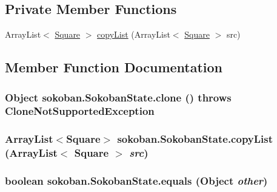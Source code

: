 \subsection*{Private Member Functions}
\begin{CompactItemize}
\item 
ArrayList$<$ \hyperlink{classsokoban_1_1Square}{Square} $>$ \hyperlink{classsokoban_1_1SokobanState_ea3454e2ffc282e13059edfff3ca9016}{copyList} (ArrayList$<$ \hyperlink{classsokoban_1_1Square}{Square} $>$ src)
\end{CompactItemize}


\subsection{Member Function Documentation}
\hypertarget{classsokoban_1_1SokobanState_5b0af9f529a44194f85d5a97e4d30e8b}{
\subsubsection[{clone}]{\setlength{\rightskip}{0pt plus 5cm}Object sokoban.SokobanState.clone ()  throws CloneNotSupportedException 	}}
\label{classsokoban_1_1SokobanState_5b0af9f529a44194f85d5a97e4d30e8b}


\hypertarget{classsokoban_1_1SokobanState_ea3454e2ffc282e13059edfff3ca9016}{
\subsubsection[{copyList}]{\setlength{\rightskip}{0pt plus 5cm}ArrayList$<${\bf Square}$>$ sokoban.SokobanState.copyList (ArrayList$<$ {\bf Square} $>$ {\em src})}}
\label{classsokoban_1_1SokobanState_ea3454e2ffc282e13059edfff3ca9016}


\hypertarget{classsokoban_1_1SokobanState_dd4ab81e98ebfe61728e86601714e782}{
\subsubsection[{equals}]{\setlength{\rightskip}{0pt plus 5cm}boolean sokoban.SokobanState.equals (Object {\em other})}}
\label{classsokoban_1_1SokobanState_dd4ab81e98ebfe61728e86601714e782}




